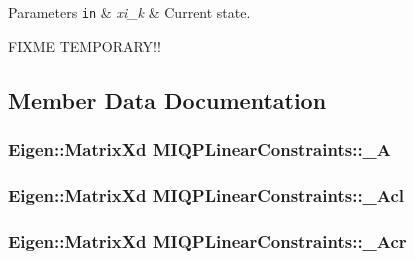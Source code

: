 \begin{DoxyParams}[1]{\-Parameters}
\mbox{\tt in}  & {\em xi\-\_\-k} & \-Current state. \\
\hline
\end{DoxyParams}
\-F\-I\-X\-M\-E \-T\-E\-M\-P\-O\-R\-A\-R\-Y!! 

\subsection{\-Member \-Data \-Documentation}
\hypertarget{classMIQPLinearConstraints_a5dfdc7553c4cbbe75ac54b34c4f29732}{
\subsubsection[{\-\_\-\-A}]{\setlength{\rightskip}{0pt plus 5cm}\-Eigen\-::\-Matrix\-Xd {\bf \-M\-I\-Q\-P\-Linear\-Constraints\-::\-\_\-\-A}}}\label{classMIQPLinearConstraints_a5dfdc7553c4cbbe75ac54b34c4f29732}
\hypertarget{classMIQPLinearConstraints_a100ca667cae697cda19ae4aef3543120}{
\subsubsection[{\-\_\-\-Acl}]{\setlength{\rightskip}{0pt plus 5cm}\-Eigen\-::\-Matrix\-Xd {\bf \-M\-I\-Q\-P\-Linear\-Constraints\-::\-\_\-\-Acl}}}\label{classMIQPLinearConstraints_a100ca667cae697cda19ae4aef3543120}
\hypertarget{classMIQPLinearConstraints_a26250a3f878cdacc0fa0c5ccf04d0bed}{
\subsubsection[{\-\_\-\-Acr}]{\setlength{\rightskip}{0pt plus 5cm}\-Eigen\-::\-Matrix\-Xd {\bf \-M\-I\-Q\-P\-Linear\-Constraints\-::\-\_\-\-Acr}}}\label{classMIQPLinearConstraints_a26250a3f878cdacc0fa0c5ccf04d0bed}
